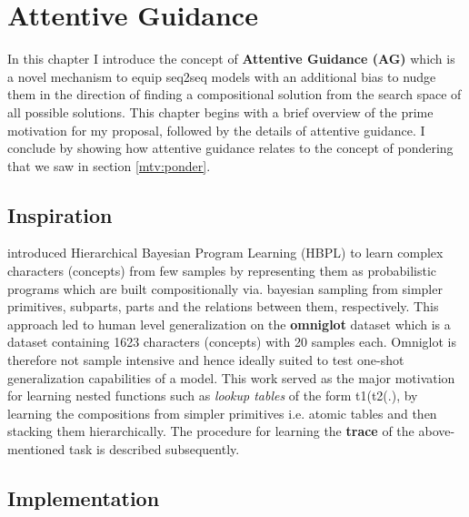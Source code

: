 \chapter{Attentive Guidance}\label{Chapter:proposals}

In this chapter I introduce the concept of \textbf{Attentive Guidance (AG)} which is a novel mechanism to equip seq2seq models with an additional bias to nudge them in the direction of finding a compositional solution from the search space of all possible solutions. This chapter begins with a brief overview of the prime motivation for my proposal, followed by the details of attentive guidance. I conclude by showing how attentive guidance relates to the concept of pondering that we saw in section \ref{mtv:ponder}.

\section{Inspiration} 

\cite{Lake2015} introduced Hierarchical Bayesian Program Learning (HBPL) to learn complex characters (concepts) from few samples by representing them as probabilistic programs which are built compositionally via. bayesian sampling from simpler primitives, subparts, parts and the relations between them, respectively. This approach led to human level generalization on the \textbf{omniglot} dataset \citep{Lake2015} which is a dataset containing 1623 characters (concepts) with 20 samples each. Omniglot is therefore not sample intensive and hence ideally suited to test one-shot generalization capabilities of a model. This work served as the major motivation for learning nested functions such as \textit{lookup tables} of the form t1(t2(.), by learning the compositions from simpler primitives i.e. atomic tables and then stacking them hierarchically. The procedure for learning the \textbf{trace} of the above-mentioned task is described subsequently.

\section{Implementation}

